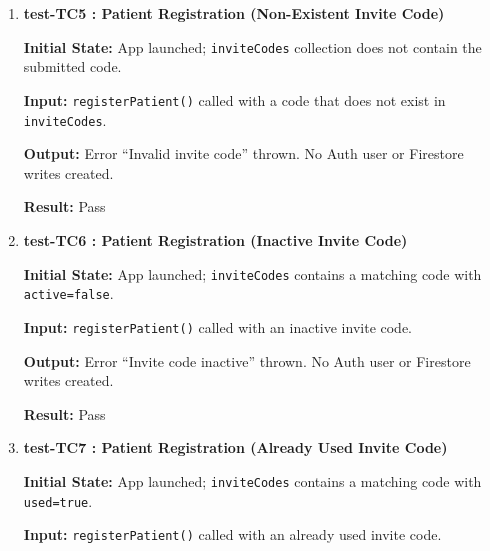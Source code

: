 \documentclass[12pt, titlepage]{article}
\begin{document}
\begin{enumerate}
	\textbf{Initial State:} App launched; \texttt{inviteCodes} collection seeded with an active, unused code containing a \texttt{physioId}.
	
	\textbf{Input:} \texttt{registerPatient()} called with a valid invite code.
	
	\textbf{Output:} Auth user created. Firestore \texttt{users/\{uid\}} written with \texttt{role="patient"} and stored \texttt{physioId}. Invite code updated with \texttt{used=true} and \texttt{usedBy=\{uid\}}.
	
	\textbf{Result:} Pass
	
	\vspace{0.5em}
	
	\item \textbf{test-TC5 : Patient Registration (Non-Existent Invite Code)}
	
	\textbf{Initial State:} App launched; \texttt{inviteCodes} collection does not contain the submitted code.
	
	\textbf{Input:} \texttt{registerPatient()} called with a code that does not exist in \texttt{inviteCodes}.
	
	\textbf{Output:} Error ``Invalid invite code'' thrown. No Auth user or Firestore writes created.
	
	\textbf{Result:} Pass
	
	\vspace{0.5em}
	
	\item \textbf{test-TC6 : Patient Registration (Inactive Invite Code)}
	
	\textbf{Initial State:} App launched; \texttt{inviteCodes} contains a matching code with \texttt{active=false}.
	
	\textbf{Input:} \texttt{registerPatient()} called with an inactive invite code.
	
	\textbf{Output:} Error ``Invite code inactive'' thrown. No Auth user or Firestore writes created.
	
	\textbf{Result:} Pass
	
	\vspace{0.5em}
	
	\item \textbf{test-TC7 : Patient Registration (Already Used Invite Code)}
	
	\textbf{Initial State:} App launched; \texttt{inviteCodes} contains a matching code with \texttt{used=true}.
	
	\textbf{Input:} \texttt{registerPatient()} called with an already used invite code.
	

\end{enumerate}
\end{document}
